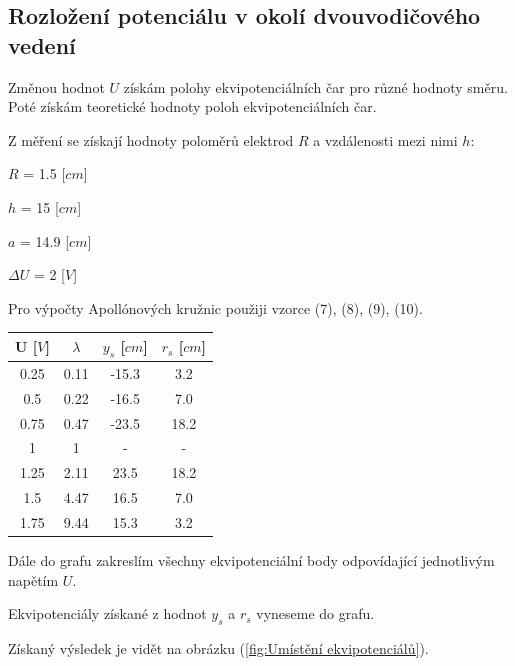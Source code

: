 \documentclass[a4paper,11pt]{article}
\begin{document}
\begin{minipage}[t]{0.5\textwidth}
        \subsection{Rozložení potenciálu v okolí dvouvodičového vedení} 
            Změnou hodnot $U$ získám polohy ekvipotenciálních čar pro různé hodnoty směru. Poté získám teoretické hodnoty poloh ekvipotenciálních čar. 
            \par Z měření se získají hodnoty poloměrů elektrod $R$ a vzdálenosti mezi nimi $h$:
            \begin{center}
                $R$ = 1.5 [$cm$]
                \par $h$ = 15 [$cm$]
                \par $a$ = 14.9 [$cm$]
                \par $\Delta U$ = 2 [$V$]
            \end{center}
            \raggedright
            \par Pro výpočty Apollónových kružnic použiji vzorce (7), (8), (9), (10).
            \vspace{20pt}
            \par \centering
            \begin{tabular}{|c|c|c|c|}
                    \hline
                    U [$V$] & $\lambda$ & $y_s$ [$cm$] & $r_s$ [$cm$] \\
                    \hline
                    0.25 & 0.11 & -15.3 & 3.2 \\
                    \hline
                    0.5 & 0.22 & -16.5 & 7.0 \\
                    \hline
                    0.75 & 0.47 & -23.5 & 18.2 \\
                    \hline
                    1 & 1 & - & - \\
                    \hline
                    1.25 & 2.11 & 23.5 & 18.2 \\
                    \hline
                    1.5 & 4.47 & 16.5 & 7.0 \\
                    \hline
                    1.75 & 9.44 & 15.3 & 3.2\\
                    \hline
                \end{tabular}
                \captionsetup{justification=centering, font=footnotesize}
                \vspace{20pt}
                \raggedright
                Dále do grafu zakreslím všechny ekvipotenciální body odpovídající jednotlivým napětím $U$.
                \par Ekvipotenciály získané z hodnot $y_s$ a $r_s$ vyneseme do grafu.
                \par Získaný výsledek je vidět na obrázku (\ref{fig:Umístění ekvipotenciálů}).
    \end{minipage}
\end{document}
